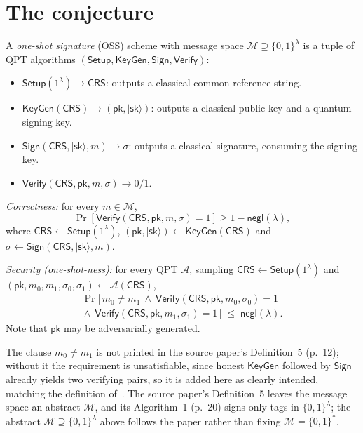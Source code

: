 \documentclass{conjura-conjecture}
\newcommand{\ket}[1]{\lvert #1 \rangle}
\newcommand{\negl}{\mathsf{negl}}
\newcommand{\Msp}{\mathcal{M}}
\newcommand{\Setup}{\mathsf{Setup}}
\newcommand{\KeyGen}{\mathsf{KeyGen}}
\newcommand{\Sign}{\mathsf{Sign}}
\newcommand{\Verify}{\mathsf{Verify}}
\newcommand{\CRS}{\mathsf{CRS}}
\newcommand{\pk}{\mathsf{pk}}
\newcommand{\sk}{\mathsf{sk}}
\begin{document}
\section{The conjecture}\label{sec:conjectures}

\begin{definition}\label{def:oss}
A \emph{one-shot signature} (OSS) scheme with message space $\Msp
\supseteq \{0,1\}^{\lambda}$ is a tuple of QPT algorithms $(\Setup,
\KeyGen, \Sign, \Verify)$:
\begin{itemize}[leftmargin=1.2em]
  \item $\Setup(1^{\lambda}) \to \CRS$: outputs a classical common
    reference string.
  \item $\KeyGen(\CRS) \to (\pk, \ket{\sk})$: outputs a classical
    public key and a quantum signing key.
  \item $\Sign(\CRS, \ket{\sk}, m) \to \sigma$: outputs a classical
    signature, consuming the signing key.
  \item $\Verify(\CRS, \pk, m, \sigma) \to 0/1$.
\end{itemize}
\emph{Correctness:} for every $m \in \Msp$,
\[
  \Pr[\Verify(\CRS, \pk, m, \sigma) = 1] \ge 1 - \negl(\lambda),
\]
where $\CRS \gets \Setup(1^{\lambda})$, $(\pk, \ket{\sk}) \gets
\KeyGen(\CRS)$ and $\sigma \gets \Sign(\CRS, \ket{\sk}, m)$.

\emph{Security (one-shot-ness):} for every QPT $\mathcal{A}$, sampling
$\CRS \gets \Setup(1^{\lambda})$ and $(\pk, m_{0}, m_{1}, \sigma_{0},
\sigma_{1}) \gets \mathcal{A}(\CRS)$,
\begin{multline*}
  \Pr\bigl[\, m_{0} \neq m_{1}
    \ \wedge\ \Verify(\CRS, \pk, m_{0}, \sigma_{0}) = 1 \\
    {}\wedge\ \Verify(\CRS, \pk, m_{1}, \sigma_{1}) = 1 \,\bigr]
    \;\le\; \negl(\lambda).
\end{multline*}
Note that $\pk$ may be adversarially generated.
\end{definition}

\begin{remark}\label{rem:oss}
The clause $m_{0} \neq m_{1}$ is not printed in the source paper's
Definition~5 (p.~12); without it the requirement is unsatisfiable,
since honest $\KeyGen$ followed by $\Sign$ already yields two
verifying pairs, so it is added here as clearly intended, matching the
definition of~\cite{AGKZ20}. The source paper's Definition~5 leaves
the message space an abstract $\Msp$, and its Algorithm~1 (p.~20)
signs only tags in $\{0,1\}^{\lambda}$; the abstract $\Msp \supseteq
\{0,1\}^{\lambda}$ above follows the paper rather than fixing $\Msp =
\{0,1\}^{*}$.
\end{remark}
\end{document}
